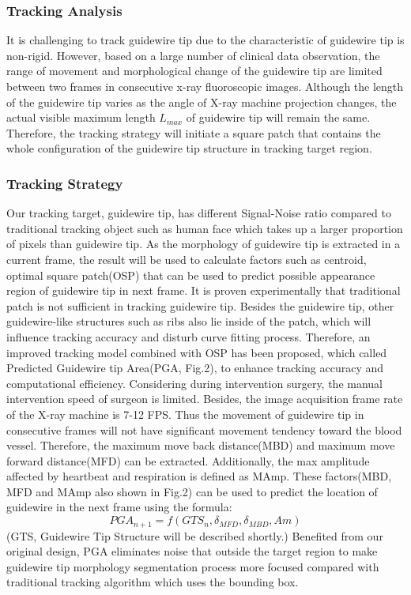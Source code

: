 \documentclass[journal]{IEEEtran}
\begin{document}
\subsubsection{Tracking Analysis}
It is challenging to track guidewire tip due to the characteristic of guidewire tip is non-rigid. However, based on a large number of clinical data observation, the range of movement and morphological change of the guidewire tip are limited between two frames in consecutive x-ray fluoroscopic images. Although the length of the guidewire tip varies as the angle of X-ray machine projection changes, the actual visible maximum length $L_{max}$ of guidewire tip will remain the same. Therefore, the tracking strategy will initiate a square patch that contains the whole configuration of the guidewire tip structure in tracking target region. 
\subsubsection{Tracking Strategy} 
Our tracking target, guidewire tip, has different Signal-Noise ratio compared to traditional tracking object such as human face which takes up a larger proportion of pixels than guidewire tip. As the morphology of guidewire tip is extracted in a current frame, the result will be used to calculate factors such as centroid, optimal square patch(OSP) that can be used to predict possible appearance region of guidewire tip in next frame. It is proven experimentally that traditional patch is not sufficient in tracking guidewire tip. Besides the guidewire tip, other guidewire-like structures such as ribs also lie inside of the patch, which will influence tracking accuracy and disturb curve fitting process. Therefore, an improved tracking model combined with OSP has been proposed, which called Predicted Guidewire tip Area(PGA, Fig.2), to enhance tracking accuracy and computational efficiency. Considering during intervention surgery, the manual intervention speed of surgeon is limited. Besides, the image acquisition frame rate of the X-ray machine is 7-12 FPS. Thus the movement of guidewire tip in consecutive frames will not have significant movement tendency toward the blood vessel. Therefore, the maximum move back distance(MBD) and maximum move forward distance(MFD) can be extracted. Additionally, the max amplitude affected by heartbeat and respiration is defined as MAmp. These factors(MBD, MFD and MAmp also shown in Fig.2) can be used to predict the location of guidewire in the next frame using the formula: $$PGA_{n+1} = f(GTS_{n}, \delta_{MFD}, \delta_{MBD}, Am)$$ (GTS, Guidewire Tip Structure will be described shortly.)
Benefited from our original design, PGA eliminates noise that outside the target region to make guidewire tip morphology segmentation process more focused compared with traditional tracking algorithm which uses the bounding box.
\end{document}
